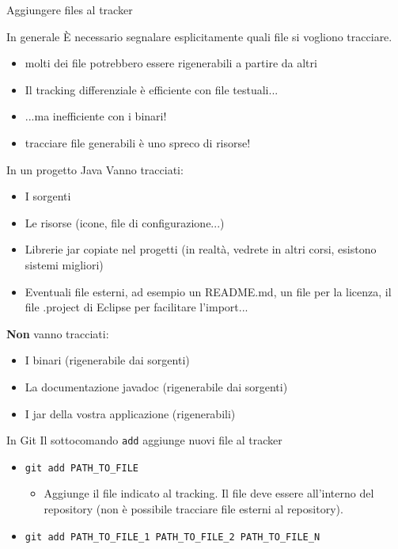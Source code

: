 \documentclass[presentation]{beamer}
\begin{document}
\begin{frame}{Aggiungere files al tracker}
	\begin{block}{In generale}	
		È necessario segnalare esplicitamente quali file si vogliono tracciare.
		\begin{itemize}
			\item molti dei file potrebbero essere rigenerabili a partire da altri
			\item Il tracking differenziale è efficiente con file testuali...
			\item ...ma inefficiente con i binari!
			\item tracciare file generabili è uno spreco di risorse!
		\end{itemize}
	\end{block}
	\begin{block}{In un progetto Java}	
		Vanno tracciati:
		\begin{itemize}
			\item I sorgenti
			\item Le risorse (icone, file di configurazione...)
			\item Librerie jar copiate nel progetti (in realtà, vedrete in altri corsi, esistono sistemi migliori)
			\item Eventuali file esterni, ad esempio un README.md, un file per la licenza, il file .project di Eclipse per facilitare l'import...
		\end{itemize}
		\textbf{Non} vanno tracciati:
		\begin{itemize}
			\item I binari (rigenerabile dai sorgenti)
			\item La documentazione javadoc (rigenerabile dai sorgenti)
			\item I jar della vostra applicazione (rigenerabili)
		\end{itemize}
	\end{block}
	\begin{block}{In Git}
		Il sottocomando \texttt{add} aggiunge nuovi file al tracker
		\begin{itemize}
			\item \texttt{git add PATH\_TO\_FILE}
			\begin{itemize}
				\item Aggiunge il file indicato al tracking. Il file deve essere all'interno del repository (non è possibile tracciare file esterni al repository).
			\end{itemize}
			\item \texttt{git add PATH\_TO\_FILE\_1 PATH\_TO\_FILE\_2 PATH\_TO\_FILE\_N}

\end{itemize}
\end{block}
\end{frame}
\end{document}

